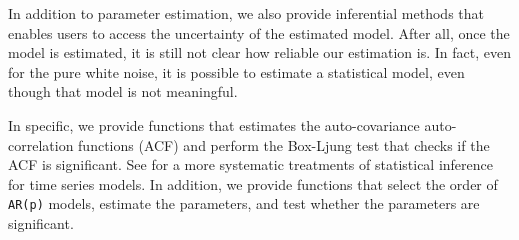 
In addition to parameter estimation, we also provide inferential methods that enables users to access the uncertainty of the estimated model. After all, once the model is estimated, it is still not clear how reliable our estimation is. In fact, even for the pure white noise, it is possible to estimate a statistical model, even though that model is not meaningful. 

In specific, we provide functions that estimates the auto-covariance auto-correlation functions (ACF) and perform  the Box-Ljung test  that checks if the  ACF is significant. See \cite{Fan} for a more systematic treatments of statistical inference for time series models. In addition, we provide functions that select the order of \texttt{AR(p)} models, estimate  the parameters, and test whether the parameters are significant.

